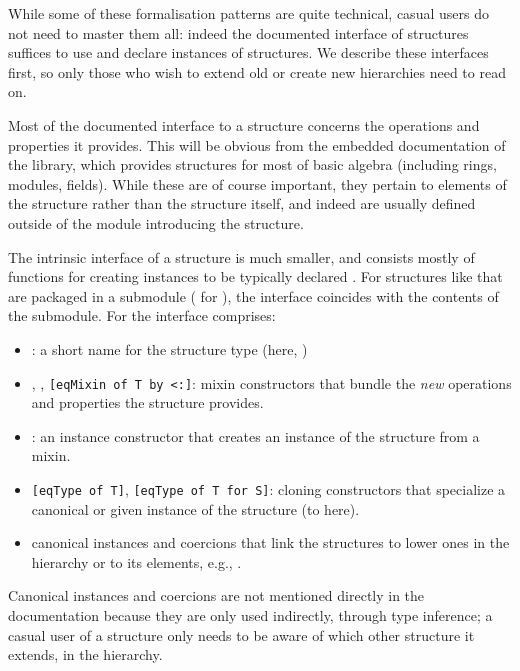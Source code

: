 While some of these formalisation patterns are quite technical, casual
users do not need to master them all: indeed the documented interface
of structures suffices to use and declare instances of structures. We
describe these interfaces first, so only those who wish to extend old
or create new hierarchies need to read on.

\label{str:itf}

Most of the documented interface to a structure concerns the operations and
properties it provides. This will be obvious from the embedded
documentation of the  library, which provides structures for
most of basic algebra (including rings, modules, fields). While these
are of course important, they pertain to elements of the structure
rather than the structure itself, and indeed are usually defined
outside of the module introducing the structure.

The intrinsic interface of a structure is much smaller, and consists mostly
of functions for creating instances to be typically
declared . For structures like 
that are packaged in a submodule ( for ), the
interface coincides with the contents of the  submodule.
For  the interface comprises:
\begin{itemize}
\item {}: a short name for the structure type (here,
  )
\item {}, , \lstinline/[eqMixin of T by <:]/:
  mixin constructors that bundle the \emph{new} operations and
  properties the structure provides.
\item {}: an instance constructor that creates an instance of
  the structure from a mixin.
\item \lstinline/[eqType of T]/, \lstinline/[eqType of T for S]/:
  cloning constructors that specialize a canonical or given instance
  of the structure (to  here).
\item canonical instances and coercions that link the structures to lower ones
  in the hierarchy or to its elements, e.g., .
\end{itemize}
\index[coq]{\C{[eqMixin of .. by <:]}}
\index[coq]{\C{[eqType of ..]}}
Canonical instances and coercions are not mentioned directly in the
documentation because they are only used indirectly, through type
inference; a casual user of a structure only needs to be aware of which other
structure it extends, in the hierarchy.

